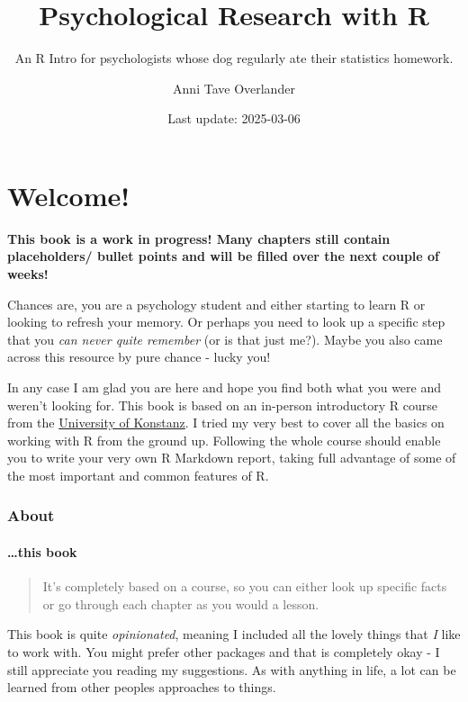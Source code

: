 \documentclass[
]{book}
\title{Psychological Research with R}
\subtitle{An R Intro for psychologists whose dog regularly ate their statistics homework.}
\author{Anni Tave Overlander}
\date{Last update: 2025-03-06}
\begin{document}
\maketitle

{
\setcounter{tocdepth}{1}
\tableofcontents
}
\chapter*{Welcome!}\label{welcome}

\textbf{This book is a work in progress! Many chapters still contain placeholders/ bullet points and will be filled over the next couple of weeks!}

Chances are, you are a psychology student and either starting to learn R or looking to refresh your memory.
Or perhaps you need to look up a specific step that you \emph{can never quite remember} (or is that just me?).
Maybe you also came across this resource by pure chance - lucky you!

In any case I am glad you are here and hope you find both what you were and weren't looking for.
This book is based on an in-person introductory R course from the \href{https://www.uni-konstanz.de/}{University of Konstanz}.
I tried my very best to cover all the basics on working with R from the ground up.
Following the whole course should enable you to write your very own R Markdown report, taking full advantage of some of the most important and common features of R.

\subsection*{About}\label{about}

\subsubsection*{\ldots this book}\label{this-book}

\begin{quote}
It's completely based on a course, so you can either look up specific facts or go through each chapter as you would a lesson.
\end{quote}

This book is quite \emph{opinionated}, meaning I included all the lovely things that \emph{I} like to work with.
You might prefer other packages and that is completely okay - I still appreciate you reading my suggestions.
As with anything in life, a lot can be learned from other peoples approaches to things.
\end{document}

